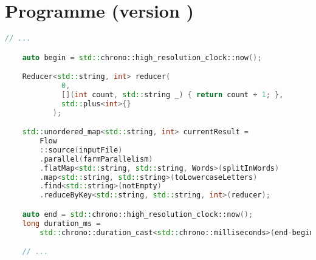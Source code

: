 \section{Programme  (version \ppff)}
\begin{lstlisting}[basicstyle=\ttfamily\footnotesize,language=c++]
    // ...

    auto begin = std::chrono::high_resolution_clock::now();

    Reducer<std::string, int> reducer(
             0, 
             [](int count, std::string _) { return count + 1; },
             std::plus<int>{}
           );

    std::unordered_map<std::string, int> currentResult = 
        Flow
        ::source(inputFile)
        .parallel(farmParallelism)
        .flatMap<std::string, std::string, Words>(splitInWords)			
        .map<std::string, std::string>(toLowercaseLetters)			
        .find<std::string>(notEmpty)	
        .reduceByKey<std::string, std::string, int>(reducer);  

    auto end = std::chrono::high_resolution_clock::now();
    long duration_ms = 
        std::chrono::duration_cast<std::chrono::milliseconds>(end-begin).count();

    // ...
\end{lstlisting}

